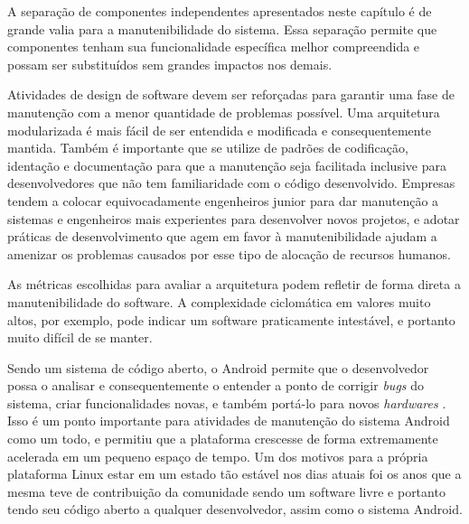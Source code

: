 A separação de componentes independentes apresentados neste capítulo é de grande valia para a manutenibilidade do sistema. Essa separação permite que componentes tenham sua funcionalidade específica melhor compreendida e possam ser substituídos sem grandes impactos nos demais. 

Atividades de design de software devem ser reforçadas para garantir uma fase de manutenção com a menor quantidade de problemas possível. Uma arquitetura modularizada é mais fácil de ser entendida e modificada e consequentemente mantida. Também é importante que se utilize de padrões de codificação, identação e documentação para que a manutenção seja facilitada inclusive para desenvolvedores que não tem familiaridade com o código desenvolvido. Empresas tendem a colocar equivocadamente engenheiros junior para dar manutenção a sistemas e engenheiros mais experientes para desenvolver novos projetos, e adotar práticas de desenvolvimento que agem em favor à manutenibilidade ajudam a amenizar os problemas causados por esse tipo de alocação de recursos humanos.

As métricas escolhidas para avaliar a arquitetura podem refletir de forma direta a manutenibilidade do software. A complexidade ciclomática em valores muito altos, por exemplo, pode indicar um software praticamente intestável, e portanto muito difícil de se manter.

Sendo um sistema de código aberto, o Android permite que o desenvolvedor possa o analisar e consequentemente o entender a ponto de corrigir \textit{bugs} do sistema, criar funcionalidades novas, e também portá-lo para novos \textit{hardwares} \cite{googleandroid}. Isso é um ponto importante para atividades de manutenção do sistema Android como um todo, e permitiu que a plataforma crescesse de forma extremamente acelerada em um pequeno espaço de tempo. Um dos motivos para a própria plataforma Linux estar em um estado tão estável nos dias atuais foi os anos que a mesma teve de contribuição da comunidade sendo um software livre e portanto tendo seu código aberto a qualquer desenvolvedor, assim como o sistema Android.

